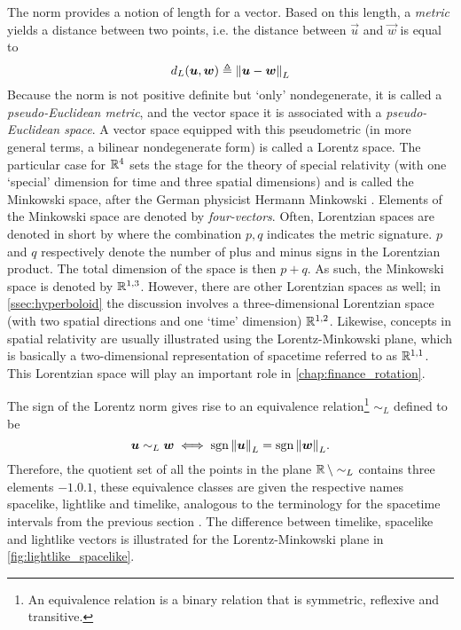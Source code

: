 The norm provides a notion of length for a vector. Based on this length, a \emph{metric} yields a distance between two points, i.e. the distance between \(\vec{u}\) and \(\vec{w}\) is equal to 
\[
     d_L(\vb*{u}, \vb*{w}) \triangleq \norm{\vb*{u} - \vb*{w}}_L
\] 
Because the norm is not positive definite but `only' nondegenerate, it is called a \emph{pseudo-Euclidean metric}, and the vector space it is associated with a \emph{pseudo-Euclidean space}. A vector space equipped with this pseudometric (in more general terms, a bilinear nondegenerate form) is called a Lorentz space. The particular case for \(\mathbb{R}^4\) sets the stage for the theory of special relativity (with one `special' dimension for time and three spatial dimensions) and is called the Minkowski space, after the German physicist Hermann Minkowski \cite{Catoni2008}. Elements of the Minkowski space are denoted by \emph{four-vectors}. Often, Lorentzian spaces are denoted in short by  where the combination $p,q$ indicates the metric signature. $p$ and $q$ respectively denote the number of plus and minus signs in the Lorentzian product. The total dimension of the space is then $p + q$. As such, the Minkowski space is denoted by $\mathbb{R}^{1,3}$. However, there are other Lorentzian spaces as well; in \cref{ssec:hyperboloid} the discussion involves a three-dimensional Lorentzian space (with two spatial directions and one `time' dimension) $\mathbb{R}^{1,2}$. Likewise, concepts in spatial relativity are usually illustrated using the Lorentz-Minkowski plane, which is basically a two-dimensional representation of spacetime referred to as $\mathbb{R}^{1,1}$. This Lorentzian space will play an important role in \cref{chap:finance_rotation}.

The sign of the Lorentz norm gives rise to an equivalence relation\footnote{An equivalence relation  is a binary relation that is symmetric, reflexive and transitive.}  \(\sim_L\) defined to be 
$$\vb*{u} \sim_L \vb*{w} \iff \operatorname{sgn}{\norm{\vb*{u}}}_L = \operatorname{sgn}{\norm{\vb*{w}}}_L.$$
Therefore, the quotient set of all the points in the plane \(\mathbb{R}\,\backslash\sim_L\) contains three elements \(\qty{-1, 0, 1}\), these equivalence classes are given the respective names spacelike, lightlike and timelike, analogous to the terminology for the spacetime intervals from the previous section \cite{Landau1971}. The difference between timelike, spacelike and lightlike vectors is illustrated for the Lorentz-Minkowski plane in \cref{fig:lightlike_spacelike}.

